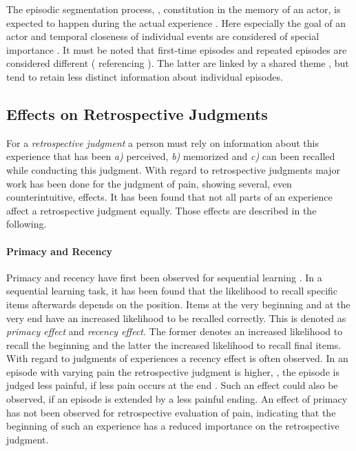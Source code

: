 The episodic segmentation process, \ie, constitution in the memory of an actor, is expected to happen during the actual experience \citep[\cf,][]{ezzyat_what_2011, kurby_segmentation_2008}.
Here especially the goal of an actor and temporal closeness of individual events are considered of special importance \citep[\cf,][]{black_episodes_1979}.
It must be noted that first-time episodes and repeated episodes are considered different (\citet{conway_construction_2000} referencing \citet{barsalou_construction_1988}).
The latter are linked by a shared theme \citep{robinson_first_1992}, but tend to retain less distinct information about individual episodes.

\subsection{Effects on Retrospective Judgments}
For a \emph{retrospective judgment} a person must rely on information about this experience that has been \emph{a)} perceived, \emph{b)} memorized and \emph{c)} can been recalled while conducting this judgment.
With regard to retrospective judgments major work has been done for the judgment of pain, showing several, even counterintuitive, effects.
It has been found that not all parts of an experience affect a retrospective judgment equally.
Those effects are described in the following.

\paragraph*{Primacy and Recency}
Primacy and recency have first been observed for sequential learning \citep[\cf,][]{murdock_jr._serial_1962}.
In a sequential learning task, it has been found that the likelihood to recall specific items afterwards depends on the position.
Items at the very beginning and at the very end have an increased likelihood to be recalled correctly.
This is denoted as \emph{primacy effect} and \emph{recency effect}.
The former denotes an increased likelihood to recall the beginning and the latter the increased likelihood to recall final items.
With regard to judgments of experiences a recency effect is often observed.
In an episode with varying pain the retrospective judgment is higher, \ie, the episode is judged less painful, if less pain occurs at the end \citep[\cf,][]{kahneman_when_1993, redelmeier_patients_1996}.
Such an effect could also be observed, if an episode is extended by a less painful ending.
An effect of primacy has not been observed for retrospective evaluation of pain, indicating that the beginning of such an experience has a reduced importance on the retrospective judgment.

